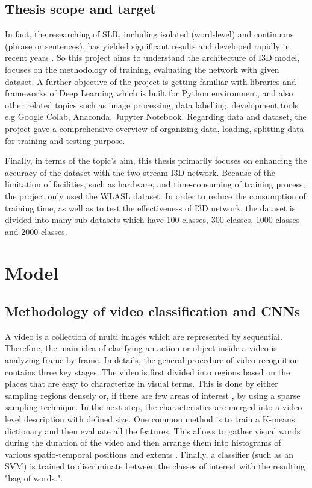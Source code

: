 \documentclass[a4paper, 12pt]{article}
\begin{document}
\subsection{Thesis scope and target}
In fact, the researching of SLR, including isolated (word-level) and continuous (phrase or sentences), has yielded significant results and developed rapidly in recent years .
So this project aims to understand the architecture of I3D model, focuses on the methodology of training, evaluating the network with given dataset. A further objective of the project is getting familiar with libraries and frameworks of Deep Learning which is built for Python environment, and also other related topics such as image processing, data labelling, development tools e.g Google Colab, Anaconda, Jupyter Notebook.
Regarding data and dataset, the project gave a comprehensive overview of organizing data, loading, splitting data for training and testing purpose.

Finally, in terms of the topic's aim, this thesis primarily focuses on enhancing the accuracy of the dataset with the two-stream I3D network. Because of the limitation of facilities, such as hardware, and time-consuming of training process, the project only used the WLASL dataset. 
In order to reduce the consumption of training time, as well as to test the effectiveness of I3D network, the dataset is divided into many sub-datasets which have 100 classes, 300 classes, 1000 classes and 2000 classes.

\section{Model}
\subsection{Methodology of video classification and CNNs}
A video is a collection of multi images which are represented by sequential. Therefore, the main idea of clarifying an action or object inside a video is analyzing frame by frame. In details, the general procedure of video recognition \citep{sivic2003video,niebles2010modeling} contains three key stages. 
The video is first divided into regions \citep{liu2009recognizing} based on the places that are easy to characterize in visual terms. This is done by either sampling regions densely \citep{wang2013action} or, if there are few areas of interest \citep{laptev2005space}, by using a sparse sampling technique. 
In the next step, the characteristics are merged into a video level description with defined size. One common method is to train a K-means dictionary and then evaluate all the features. This allows to gather visual words during the duration of the video and then arrange them into histograms of various spatio-temporal positions and extents \citep{karpathy2014large,laptev2008learning}.
Finally, a classifier (such as an SVM) is trained to discriminate between the classes of interest with the resulting "bag of words.".
\end{document}
